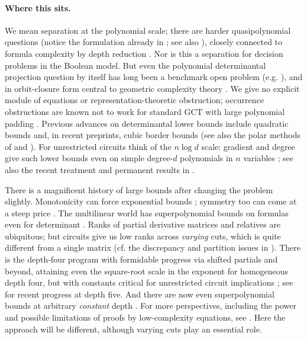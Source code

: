 \documentclass[11pt,letterpaper]{article}
\theoremstyle{definition}
\numberwithin{equation}{section}
\begin{document}
\paragraph{Where this sits.}
We mean separation at the polynomial scale; there are harder quasipolynomial questions (notice the
formulation already in \cite{Valiant}; see also \cite{MulmuleySohoni2008}), closely connected to
formula complexity by depth reduction \cite{Hyafil,VSBR}. Nor is this a separation for decision problems
in the Boolean model. But even the polynomial determinantal projection question by itself
has long been a benchmark open problem (e.g. \cite{AviICM}), and in orbit-closure form central to
geometric complexity theory \cite{MulmuleySohoni,MulmuleySohoni2008,BLMW,BIPnooccurrence}. We give
no explicit module of equations or
representation-theoretic obstruction; occurrence obstructions are known not to work for
standard GCT with large polynomial padding \cite{BIPnooccurrence}. Previous advances on determinantal
lower bounds include quadratic bounds \cite{MignonRessayre,CaiChenLi,LandsbergManivelRessayre} and,
in recent preprints, cubic border
bounds \cite{CubOAI,Sheshadri287} (see also the polar methods of \cite{SheshadriBorder2026} and
\cite{KumarVolk2026}). For unrestricted circuits think
of the $n\log d$ scale: gradient and degree give such lower bounds even on simple degree-$d$
polynomials in $n$ variables \cite{BaurStrassen,StrassenBezout}; see also the recent treatment and
permanent results in
\cite{TenAdvances}.

There is a magnificent history of large bounds after changing the problem slightly.
Monotonicity can force exponential bounds \cite{Val80,JerrumSnir}; symmetry too can come at a steep price
\cite{DawarWilsenach}. The multilinear world has superpolynomial bounds on formulas even for determinant
\cite{RazMultilinear}. Ranks of partial derivative matrices and relatives \cite{Nisan,NW97pd,CKW}
are ubiquitous; but
circuits give us low ranks across \emph{varying} cuts, which is quite different from a single matrix (cf.
the discrepancy and partition issues in \cite{Raz06,RSY08,AKV20,BFLY26,CKSS24}). There is the depth-four program
\cite{AgrawalVinay,Koiran2012,Tavenas2013} with formidable progress via shifted partials and beyond,
attaining even the
square-root scale in the exponent for homogeneous depth four, but with constants critical for
unrestricted circuit implications \cite{Kayal2012,GKKS14,KSS13regular,KLSS14,KumarSaraf2014}; see
\cite{DEP5OAI} for recent progress at depth five.
And there are now even superpolynomial bounds at arbitrary \emph{constant} depth
\cite{LSTconst,BDS24,Forbes2024}. For
more perspectives, including the power and possible limitations of proofs by low-complexity
equations, see \cite{ShpilkaYehudayoff,KSsurvey,Gro15,GKSS17,FSV18}. Here the approach will be
different, although varying cuts
play an essential role.
\end{document}
